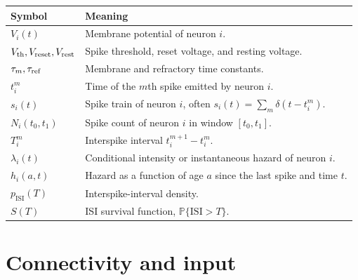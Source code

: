 \begin{tabularx}{\textwidth}{@{}p{}X@{}}
\toprule
\textbf{Symbol} & \textbf{Meaning} \\
\midrule
$V_i(t)$ & Membrane potential of neuron $i$. \\
$V_{\text{th}},V_{\text{reset}},V_{\text{rest}}$ & Spike threshold, reset voltage, and resting voltage. \\
$\tau_m,\tau_{\text{ref}}$ & Membrane and refractory time constants. \\
$t_i^m$ & Time of the $m$th spike emitted by neuron $i$. \\
$s_i(t)$ & Spike train of neuron $i$, often $s_i(t)=\sum_m \delta(t-t_i^m)$. \\
$N_i(t_0,t_1)$ & Spike count of neuron $i$ in window $[t_0,t_1]$. \\
$T_i^m$ & Interspike interval $t_i^{m+1}-t_i^m$. \\
$\lambda_i(t)$ & Conditional intensity or instantaneous hazard of neuron $i$. \\
$h_i(a,t)$ & Hazard as a function of age $a$ since the last spike and time $t$. \\
$p_{\mathrm{ISI}}(T)$ & Interspike-interval density. \\
$S(T)$ & ISI survival function, $\mathbb{P}\{\mathrm{ISI}>T\}$. \\
\bottomrule
\end{tabularx}

\section{Connectivity and input}
\label{app:notation-connectivity}

